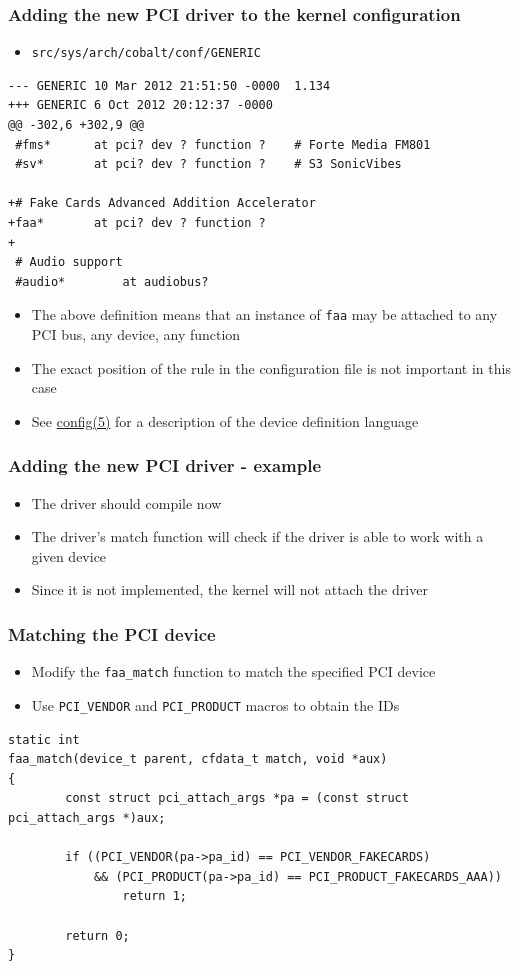 \documentclass[dvipsnames,table]{beamer}
\begin{document}
\begin{frame}[fragile]
\frametitle{Adding the new PCI driver to the kernel configuration}
\scriptsize
\begin{itemize}
	\item {\tt src/sys/arch/cobalt/conf/GENERIC}
\end{itemize}
\begin{verbatim}
--- GENERIC	10 Mar 2012 21:51:50 -0000	1.134
+++ GENERIC	6 Oct 2012 20:12:37 -0000
@@ -302,6 +302,9 @@
 #fms*		at pci? dev ? function ?	# Forte Media FM801
 #sv*		at pci? dev ? function ?	# S3 SonicVibes
 
+# Fake Cards Advanced Addition Accelerator
+faa*		at pci? dev ? function ?
+
 # Audio support
 #audio*		at audiobus?
\end{verbatim}
\normalsize
\begin{itemize}
	\item The above definition means that an instance of {\tt faa} may be attached to any PCI bus, any device, any function
	\item The exact position of the rule in the configuration file is not important in this case
	\item See \href{http://netbsd.gw.com/cgi-bin/man-cgi?config+5+NetBSD-current}{config(5)} for a description of the device definition language
\end{itemize}
\end{frame}

\begin{frame}
\frametitle{Adding the new PCI driver - example}
\begin{itemize}
	\item The driver should compile now
	\item The driver's match function will check if the driver is able to work with a given device
 	\item Since it is not implemented, the kernel will not attach the driver
\end{itemize}
\end{frame}

\begin{frame}[fragile]
\frametitle{Matching the PCI device}
\begin{itemize}
	\item Modify the {\tt faa\_match} function to match the specified PCI device
	\item Use {\tt PCI\_VENDOR} and {\tt PCI\_PRODUCT} macros to obtain the IDs
\end{itemize}
\scriptsize
\begin{lstlisting}
static int
faa_match(device_t parent, cfdata_t match, void *aux)
{
        const struct pci_attach_args *pa = (const struct pci_attach_args *)aux;

        if ((PCI_VENDOR(pa->pa_id) == PCI_VENDOR_FAKECARDS) 
            && (PCI_PRODUCT(pa->pa_id) == PCI_PRODUCT_FAKECARDS_AAA))
                return 1;

        return 0;
}
\end{lstlisting}
\end{frame}
\end{document}
